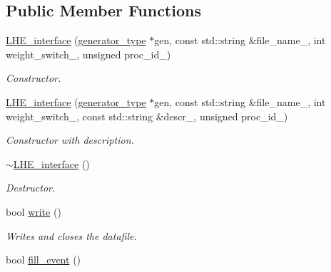 \subsection*{Public Member Functions}
\begin{DoxyCompactItemize}
\item 
\hypertarget{a00323_ab899574bcfbb64ccfcf32115e29b8d3f}{\hyperlink{a00323_ab899574bcfbb64ccfcf32115e29b8d3f}{L\-H\-E\-\_\-interface} (\hyperlink{a00442}{generator\-\_\-type} $\ast$gen, const std\-::string \&file\-\_\-name\-\_\-, int weight\-\_\-switch\-\_\-, unsigned proc\-\_\-id\-\_)}\label{a00323_ab899574bcfbb64ccfcf32115e29b8d3f}

\begin{DoxyCompactList}\small\item\em Constructor. \end{DoxyCompactList}\item 
\hypertarget{a00323_a3e407eda72246cf24b54b4154c9c845a}{\hyperlink{a00323_a3e407eda72246cf24b54b4154c9c845a}{L\-H\-E\-\_\-interface} (\hyperlink{a00442}{generator\-\_\-type} $\ast$gen, const std\-::string \&file\-\_\-name\-\_\-, int weight\-\_\-switch\-\_\-, const std\-::string \&descr\-\_\-, unsigned proc\-\_\-id\-\_)}\label{a00323_a3e407eda72246cf24b54b4154c9c845a}

\begin{DoxyCompactList}\small\item\em Constructor with description. \end{DoxyCompactList}\item 
\hypertarget{a00323_aa054e0ffb00c9136509cf6b136446026}{\hyperlink{a00323_aa054e0ffb00c9136509cf6b136446026}{$\sim$\-L\-H\-E\-\_\-interface} ()}\label{a00323_aa054e0ffb00c9136509cf6b136446026}

\begin{DoxyCompactList}\small\item\em Destructor. \end{DoxyCompactList}\item 
\hypertarget{a00323_a563ae5ac0c1389fea0bd7616eef95ca3}{bool \hyperlink{a00323_a563ae5ac0c1389fea0bd7616eef95ca3}{write} ()}\label{a00323_a563ae5ac0c1389fea0bd7616eef95ca3}

\begin{DoxyCompactList}\small\item\em Writes and closes the datafile. \end{DoxyCompactList}\item 
\hypertarget{a00323_a1815dc45320bbf0d041064bdf1521317}{bool \hyperlink{a00323_a1815dc45320bbf0d041064bdf1521317}{fill\-\_\-event} ()}\label{a00323_a1815dc45320bbf0d041064bdf1521317}


\end{DoxyCompactItemize}
